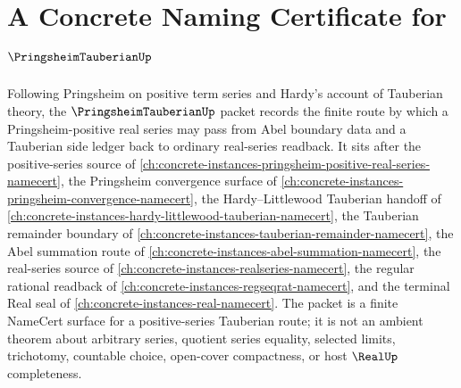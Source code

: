 \chapter{A Concrete Naming Certificate for $\PringsheimTauberianUp$}
\label{ch:concrete-instances-pringsheim-tauberian-namecert}

Following Pringsheim on positive term series and Hardy's account of Tauberian theory, the $\PringsheimTauberianUp$ packet records the finite route by which a Pringsheim-positive real series may pass from Abel boundary data and a Tauberian side ledger back to ordinary real-series readback. It sits after the positive-series source of \autoref{ch:concrete-instances-pringsheim-positive-real-series-namecert}, the Pringsheim convergence surface of \autoref{ch:concrete-instances-pringsheim-convergence-namecert}, the Hardy--Littlewood Tauberian handoff of \autoref{ch:concrete-instances-hardy-littlewood-tauberian-namecert}, the Tauberian remainder boundary of \autoref{ch:concrete-instances-tauberian-remainder-namecert}, the Abel summation route of \autoref{ch:concrete-instances-abel-summation-namecert}, the real-series source of \autoref{ch:concrete-instances-realseries-namecert}, the regular rational readback of \autoref{ch:concrete-instances-regseqrat-namecert}, and the terminal Real seal of \autoref{ch:concrete-instances-real-namecert}. The packet is a finite NameCert surface for a positive-series Tauberian route; it is not an ambient theorem about arbitrary series, quotient series equality, selected limits, trichotomy, countable choice, open-cover compactness, or host $\RealUp$ completeness.

